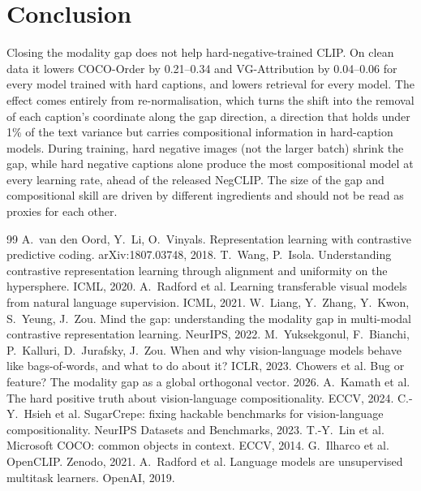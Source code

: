 \documentclass[11pt,a4paper]{article}
\begin{document}
\section{Conclusion}

Closing the modality gap does not help hard-negative-trained CLIP. On clean data it lowers COCO-Order by
0.21--0.34 and VG-Attribution by 0.04--0.06 for every model trained with hard captions, and lowers
retrieval for every model. The effect comes entirely from re-normalisation, which turns the shift into
the removal of each caption's coordinate along the gap direction, a direction that holds under 1\% of the
text variance but carries compositional information in hard-caption models. During training, hard
negative images (not the larger batch) shrink the gap, while hard negative captions alone produce the
most compositional model at every learning rate, ahead of the released NegCLIP. The size of the gap and
compositional skill are driven by different ingredients and should not be read as proxies for each other.

\begin{thebibliography}{99}\small
{} A.\ van den Oord, Y.\ Li, O.\ Vinyals. Representation learning with contrastive predictive coding. arXiv:1807.03748, 2018.
 T.\ Wang, P.\ Isola. Understanding contrastive representation learning through alignment and uniformity on the hypersphere. ICML, 2020.
 A.\ Radford et al. Learning transferable visual models from natural language supervision. ICML, 2021.
 W.\ Liang, Y.\ Zhang, Y.\ Kwon, S.\ Yeung, J.\ Zou. Mind the gap: understanding the modality gap in multi-modal contrastive representation learning. NeurIPS, 2022.
 M.\ Yuksekgonul, F.\ Bianchi, P.\ Kalluri, D.\ Jurafsky, J.\ Zou. When and why vision-language models behave like bags-of-words, and what to do about it? ICLR, 2023.
 Chowers et al. Bug or feature? The modality gap as a global orthogonal vector. 2026.
 A.\ Kamath et al. The hard positive truth about vision-language compositionality. ECCV, 2024.
 C.-Y.\ Hsieh et al. SugarCrepe: fixing hackable benchmarks for vision-language compositionality. NeurIPS Datasets and Benchmarks, 2023.
 T.-Y.\ Lin et al. Microsoft COCO: common objects in context. ECCV, 2014.
 G.\ Ilharco et al. OpenCLIP. Zenodo, 2021.
 A.\ Radford et al. Language models are unsupervised multitask learners. OpenAI, 2019.
\end{thebibliography}
\end{document}
